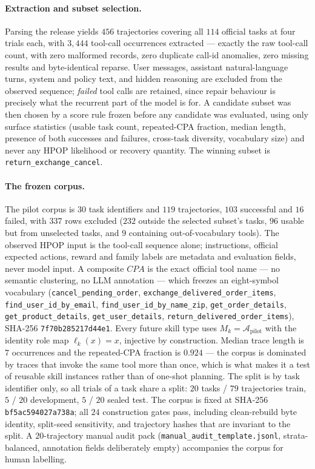\paragraph{Extraction and subset selection.}
Parsing the release yields $456$ trajectories covering all $114$ official tasks
at four trials each, with $3{,}444$ tool-call occurrences extracted --- exactly
the raw tool-call count, with zero malformed records, zero duplicate call-id
anomalies, zero missing results and byte-identical reparse. User messages,
assistant natural-language turns, system and policy text, and hidden reasoning
are excluded from the observed sequence; \emph{failed} tool calls are retained,
since repair behaviour is precisely what the recurrent part of the model is
for. A candidate subset was then chosen by a score rule frozen before any
candidate was evaluated, using only surface statistics (usable task count,
repeated-CPA fraction, median length, presence of both successes and failures,
cross-task diversity, vocabulary size) and never any HPOP likelihood or
recovery quantity. The winning subset is
\texttt{return\_exchange\_cancel}.

\paragraph{The frozen corpus.}
The pilot corpus is $30$ task identifiers and $119$ trajectories, $103$
successful and $16$ failed, with $337$ rows excluded ($232$ outside the selected
subset's tasks, $96$ usable but from unselected tasks, and $9$ containing
out-of-vocabulary tools). The observed HPOP input is the tool-call sequence
alone; instructions, official expected actions, reward and family labels are
metadata and evaluation fields, never model input. A composite $CPA$ is the
exact official tool name --- no semantic clustering, no LLM annotation --- which
freezes an eight-symbol vocabulary
(\texttt{cancel\_pending\_order}, \texttt{exchange\_delivered\_order\_items},
\texttt{find\_user\_id\_by\_email}, \texttt{find\_user\_id\_by\_name\_zip},
\texttt{get\_order\_details}, \texttt{get\_product\_details},
\texttt{get\_user\_details}, \texttt{return\_delivered\_order\_items}),
SHA-256 \texttt{7f70b285217d44e1}. Every future skill type uses
$M_k = \mathcal{A}_{\text{pilot}}$ with the identity role map
$\ell_k(x) = x$, injective by construction. Median trace length is $7$
occurrences and the repeated-CPA fraction is $0.924$ --- the corpus is dominated
by traces that invoke the same tool more than once, which is what makes it a
test of reusable skill instances rather than of one-shot planning. The split is
by task identifier only, so all trials of a task share a split: $20$ tasks /
$79$ trajectories train, $5$ / $20$ development, $5$ / $20$ sealed test. The
corpus is fixed at SHA-256 \texttt{bf5ac594027a738a}; all $24$ construction
gates pass, including clean-rebuild byte identity, split-seed sensitivity, and
trajectory hashes that are invariant to the split. A $20$-trajectory manual
audit pack (\texttt{manual\_audit\_template.jsonl}, strata-balanced, annotation
fields deliberately empty) accompanies the corpus for human labelling.

